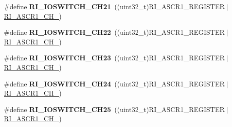 \begin{DoxyCompactItemize}
\item 
\hypertarget{group___r_i___i_o_switch_gaf4cbc545f20f7b58420f5ad3bd7c1a14}{\#define {\bfseries R\-I\-\_\-\-I\-O\-S\-W\-I\-T\-C\-H\-\_\-\-C\-H21}~((uint32\-\_\-t)R\-I\-\_\-\-A\-S\-C\-R1\-\_\-\-R\-E\-G\-I\-S\-T\-E\-R $\vert$ \hyperlink{group___peripheral___registers___bits___definition_ga5afe98d489b31057e3013293fbb13c8d}{R\-I\-\_\-\-A\-S\-C\-R1\-\_\-\-C\-H\-\_})}\label{group___r_i___i_o_switch_gaf4cbc545f20f7b58420f5ad3bd7c1a14}

\item 
\hypertarget{group___r_i___i_o_switch_ga78478a60de3b47617d61a7ebba3300ec}{\#define {\bfseries R\-I\-\_\-\-I\-O\-S\-W\-I\-T\-C\-H\-\_\-\-C\-H22}~((uint32\-\_\-t)R\-I\-\_\-\-A\-S\-C\-R1\-\_\-\-R\-E\-G\-I\-S\-T\-E\-R $\vert$ \hyperlink{group___peripheral___registers___bits___definition_gaf815cb08076563c90563eec1b746d11a}{R\-I\-\_\-\-A\-S\-C\-R1\-\_\-\-C\-H\-\_})}\label{group___r_i___i_o_switch_ga78478a60de3b47617d61a7ebba3300ec}

\item 
\hypertarget{group___r_i___i_o_switch_ga68277f0de29b54ba9d24d949ed8e526a}{\#define {\bfseries R\-I\-\_\-\-I\-O\-S\-W\-I\-T\-C\-H\-\_\-\-C\-H23}~((uint32\-\_\-t)R\-I\-\_\-\-A\-S\-C\-R1\-\_\-\-R\-E\-G\-I\-S\-T\-E\-R $\vert$ \hyperlink{group___peripheral___registers___bits___definition_ga4ee58ed0f420ae3f55141b5e540d4c9d}{R\-I\-\_\-\-A\-S\-C\-R1\-\_\-\-C\-H\-\_})}\label{group___r_i___i_o_switch_ga68277f0de29b54ba9d24d949ed8e526a}

\item 
\hypertarget{group___r_i___i_o_switch_ga40e84756761134055e6dddf706ff746c}{\#define {\bfseries R\-I\-\_\-\-I\-O\-S\-W\-I\-T\-C\-H\-\_\-\-C\-H24}~((uint32\-\_\-t)R\-I\-\_\-\-A\-S\-C\-R1\-\_\-\-R\-E\-G\-I\-S\-T\-E\-R $\vert$ \hyperlink{group___peripheral___registers___bits___definition_gae29aa20ea8efe6e1c21dc438cbd408d8}{R\-I\-\_\-\-A\-S\-C\-R1\-\_\-\-C\-H\-\_})}\label{group___r_i___i_o_switch_ga40e84756761134055e6dddf706ff746c}

\item 
\hypertarget{group___r_i___i_o_switch_ga5b9af819e2b157bdf45f56b57620fe5c}{\#define {\bfseries R\-I\-\_\-\-I\-O\-S\-W\-I\-T\-C\-H\-\_\-\-C\-H25}~((uint32\-\_\-t)R\-I\-\_\-\-A\-S\-C\-R1\-\_\-\-R\-E\-G\-I\-S\-T\-E\-R $\vert$ \hyperlink{group___peripheral___registers___bits___definition_gaabf632afea743545719609559260b308}{R\-I\-\_\-\-A\-S\-C\-R1\-\_\-\-C\-H\-\_})}\label{group___r_i___i_o_switch_ga5b9af819e2b157bdf45f56b57620fe5c}


\end{DoxyCompactItemize}

